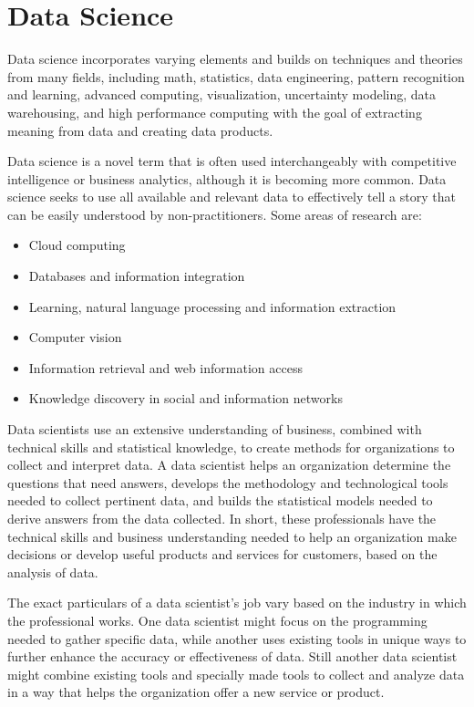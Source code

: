 \documentclass[]{report}
\begin{document}
\section{Data Science}
Data science incorporates varying elements and builds on techniques and theories from many fields, including math, statistics, data engineering, pattern recognition and learning, advanced computing, visualization, uncertainty modeling, data warehousing, and high performance computing with the goal of extracting meaning from data and creating data products.

Data science is a novel term that is often used interchangeably with competitive intelligence or business analytics, although it is becoming more common. Data science seeks to use all available and relevant data to effectively tell a story that can be easily understood by non-practitioners. Some areas of research are:
\begin{itemize}
\item  Cloud computing 
\item  Databases and information integration 
\item  Learning, natural language processing and information extraction 
\item  Computer vision 
\item  Information retrieval and web information access 
\item  Knowledge discovery in social and information networks 
\end{itemize}


Data scientists use an extensive understanding of business, combined with technical skills and statistical knowledge, to create methods for organizations to collect and interpret data. A data scientist helps an organization determine the questions that need answers, develops the methodology and technological tools needed to collect pertinent data, and builds the statistical models needed to derive answers from the data collected. In short, these professionals have the technical skills and business understanding needed to help an organization make decisions or develop useful products and services for customers, based on the analysis of data.

The exact particulars of a data scientist's job vary based on the industry in which the professional works. One data scientist might focus on the programming needed to gather specific data, while another uses existing tools in unique ways to further enhance the accuracy or effectiveness of data. Still another data scientist might combine existing tools and specially made tools to collect and analyze data in a way that helps the organization offer a new service or product.
\end{document}
